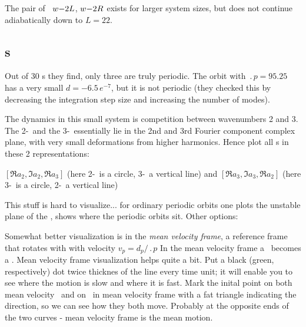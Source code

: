 The pair of \reqva\ 
${w-}2L$,
${w-}2R$
exists for larger system sizes, but does not continue 
adiabatically down to $L=22$.

\subsection{\Rpo s}

%
Out of 30 \rpo s they
find,  only three are truly periodic.  The orbit
with $\period{p} = 95.25$ has a very small
$d = -6.5\,e^{-7}$, but it is not periodic 
(they
checked this by decreasing the integration step size and increasing the
number of modes).

The dynamics in this small system is competition between wavenumbers
2 and 3. The 2-\eqv\  and the 3-\eqv\  essentially lie in
the 2nd and 3rd Fourier component complex plane, with very
small deformations from higher harmonics.
Hence plot all \rpo s in these 2 representations:

$[ \Re a_2, \Im a_2, \Re a_3 ]$
(here 2-\eqv\  is a circle, 3-\eqv\ a vertical line)
 and
$[ \Re a_3, \Im a_3, \Re a_2 ]$
(here 3-\eqv\ is a circle, 2-\eqv\ a vertical line)

This stuff is hard to visualize... for ordinary periodic orbits one
plots the unstable plane of the \eqv, shows where the periodic
orbits sit. Other options:

Somewhat better visualization is in the
{\em mean velocity frame}, {\ie} 
a reference frame that rotates with with velocity 
$v_p=d_p/\period{p}$
In the mean velocity frame a \rpo\ becomes
a \po.
Mean velocity frame visualization helps quite a bit.
Put a black (green, respectively) dot
twice thicknes of the line every time unit; it will enable you to see
where the motion is slow and where it is fast.
Mark the inital point on both
mean velocity \rpo\ and on \eqv\  in mean velocity
 frame with a fat triangle
indicating the direction, so we can see how they both move. Probably at the
opposite ends of the two curves - mean velocity frame is the mean motion.


